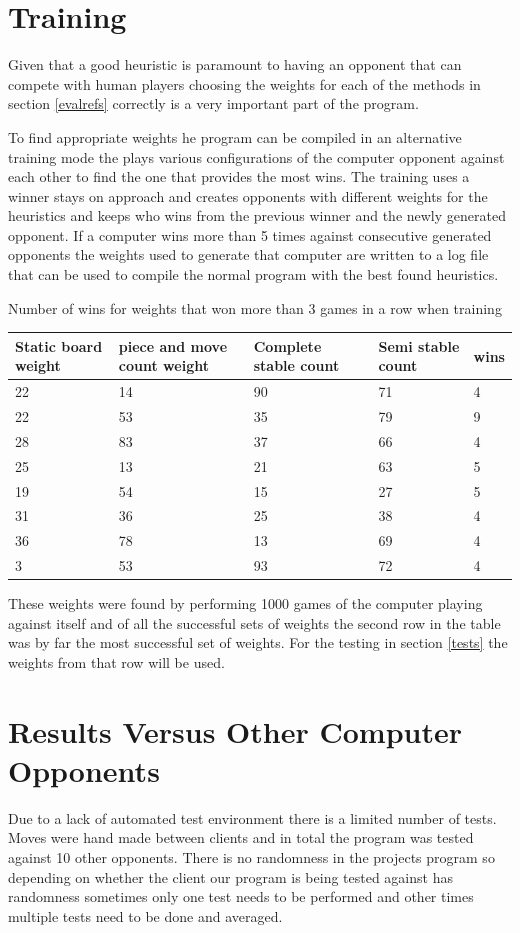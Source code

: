 \documentclass[final]{cmpreport}
\begin{document}
\section{Training}
Given that a good heuristic is paramount to having an opponent that can compete with human players choosing the weights for each of the methods in section \ref{evalrefs} correctly is a very important part of the program.

To find appropriate weights he program can be compiled in an alternative training mode the plays various configurations of the computer opponent against each other to find the one that provides the most wins. The training uses a winner stays on approach and creates opponents with different weights for the heuristics and keeps who wins from the previous winner and the newly generated opponent. If a computer wins more than 5 times against consecutive generated opponents the weights used to generate that computer are written to a log file that can be used to compile the normal program with the best found heuristics.

\begin{cmptable}[htb]{Number of wins for weights that won more than 3 games in a row when training \label{weights}}
	\begin{tabular}{|p{2cm}|p{2cm}|p{2cm}|p{2cm}|p{4cm}|}
		\hline
		Static board weight & piece and move count weight & Complete stable count & Semi stable count & wins \\ \hline
		22 & 14 & 90 & 71 & 4 \\ \hline
		22 & 53 & 35 & 79 & 9 \\ \hline
		28 & 83 & 37 & 66 & 4 \\ \hline
		25 & 13 & 21 & 63 & 5 \\ \hline
		19 & 54 & 15 & 27 & 5 \\ \hline
		31 & 36 & 25 & 38 & 4 \\ \hline
		36 & 78 & 13 & 69 & 4 \\ \hline
		3 & 53 & 93 & 72 & 4 \\ \hline
	\end{tabular}
\end{cmptable}
\FloatBarrier

These weights were found by performing 1000 games of the computer playing against itself and of all the successful sets of weights the second row in the table was by far the most successful set of weights. For the testing in section \ref{tests} the weights from that row will be used.
\section{Results Versus Other Computer Opponents}
Due to a lack of automated test environment there is a limited number of tests. Moves were hand made between clients and in total the program was tested against 10 other opponents. There is no randomness in the projects program so depending on whether the client our program is being tested against has randomness sometimes only one test needs to be performed and other times multiple tests need to be done and averaged. 
\end{document}
